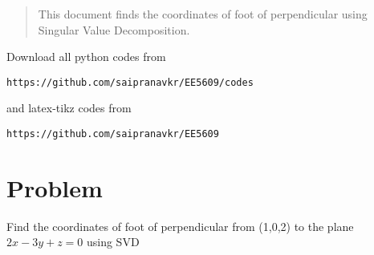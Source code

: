 \documentclass[journal,12pt,twocolumn]{IEEEtran}
\begin{document}
%
\begin{abstract}
This document finds the coordinates of foot of perpendicular using Singular Value Decomposition.
\end{abstract}
Download all python codes from 
%
\begin{lstlisting}
https://github.com/saipranavkr/EE5609/codes
\end{lstlisting}
%
and latex-tikz codes from 
%
\begin{lstlisting}
https://github.com/saipranavkr/EE5609
\end{lstlisting}
%
\renewcommand{\theenumi}{\roman{enumi}}%
\section{Problem}
Find the coordinates of foot of perpendicular from (1,0,2) to the plane $2x-3y+z=0$ using SVD
%
%
\end{document}
